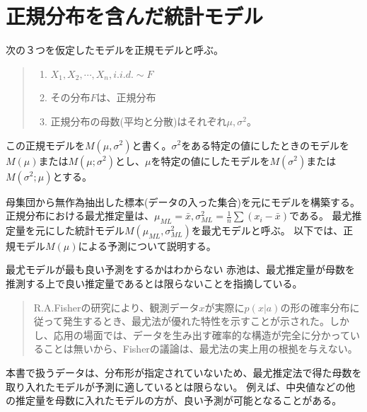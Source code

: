 \section{正規分布を含んだ統計モデル}
次の３つを仮定したモデルを正規モデルと呼ぶ。
\begin{quote}
    \begin{enumerate}[(1)]
    \item $X_1,X_2,\cdots,X_n, i.i.d. \sim F$
    \item その分布$F$は、正規分布
    \item 正規分布の母数(平均と分散)はそれぞれ$\mu,\sigma^2$。
    \end{enumerate}
\end{quote}
この正規モデルを$M(\mu,\sigma^2)$と書く。$\sigma^2$をある特定の値にしたときのモデルを$M(\mu)$または$M(\mu;\sigma^2)$とし、$\mu$を特定の値にしたモデルを$M(\sigma^2)$または$M(\sigma^2;\mu)$とする。

母集団から無作為抽出した標本(データの入った集合)を元にモデルを構築する。正規分布における最尤推定量は、$\mu_{ML}=\bar{x},\sigma^2_{ML}=\frac{1}{n}\sum(x_i-\bar{x})$である。
最尤推定量を元にした統計モデル$M(\mu_{ML},\sigma^2_{ML})$を最尤モデルと呼ぶ。
以下では、正規モデル$M(\mu)$による予測について説明する。

\begin{SMbox}{最尤モデルが最も良い予測をするかはわからない}
赤池は、最尤推定量が母数を推測する上で良い推定量であるとは限らないことを指摘している\cite{1570854174583769344}。
 \begin{quote}
  R.A.Fisherの研究により、観測データ$x$が実際に$p(x|a)$の形の確率分布に従って発生するとき、最尤法が優れた特性を示すことが示された。しかし、応用の場面では、データを生み出す確率的な構造が完全に分かっていることは無いから、Fisherの議論は、最尤法の実上用の根拠を与えない。
 \end{quote}

 本書で扱うデータは、分布形が指定されていないため、最尤推定法で得た母数を取り入れたモデルが予測に適しているとは限らない。
 例えば、中央値などの他の推定量を母数に入れたモデルの方が、良い予測が可能となることがある。

\end{SMbox}



